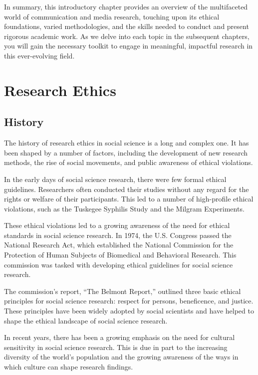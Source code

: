 \documentclass[
  b5paper]{book}
\begin{document}
In summary, this introductory chapter provides an overview of the multifaceted world of communication and media research, touching upon its ethical foundations, varied methodologies, and the skills needed to conduct and present rigorous academic work. As we delve into each topic in the subsequent chapters, you will gain the necessary toolkit to engage in meaningful, impactful research in this ever-evolving field.

\hypertarget{research-ethics-1}{%
\chapter{Research Ethics}\label{research-ethics-1}}

\hypertarget{history}{%
\section{History}\label{history}}

The history of research ethics in social science is a long and complex one. It has been shaped by a number of factors, including the development of new research methods, the rise of social movements, and public awareness of ethical violations.

In the early days of social science research, there were few formal ethical guidelines. Researchers often conducted their studies without any regard for the rights or welfare of their participants. This led to a number of high-profile ethical violations, such as the Tuskegee Syphilis Study and the Milgram Experiments.

These ethical violations led to a growing awareness of the need for ethical standards in social science research. In 1974, the U.S. Congress passed the National Research Act, which established the National Commission for the Protection of Human Subjects of Biomedical and Behavioral Research. This commission was tasked with developing ethical guidelines for social science research.

The commission's report, ``The Belmont Report,'' outlined three basic ethical principles for social science research: respect for persons, beneficence, and justice. These principles have been widely adopted by social scientists and have helped to shape the ethical landscape of social science research.

In recent years, there has been a growing emphasis on the need for cultural sensitivity in social science research. This is due in part to the increasing diversity of the world's population and the growing awareness of the ways in which culture can shape research findings.
\end{document}
